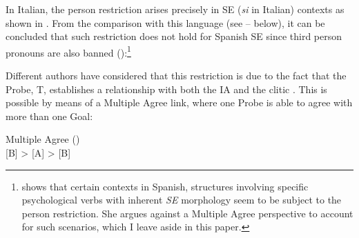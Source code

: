 \documentclass[output=paper,colorlinks,citecolor=brown]{langscibook}
\begin{document}
In Italian, the person restriction arises precisely in
SE (\textit{si} in Italian) contexts as shown in . From the comparison with this language (see -- below), it can be concluded that such restriction does not hold for Spanish SE since third person pronouns are also banned
(\citealt[248]{OrdonezTrevino2016}):\footnote{\citet{Rivero2004} shows that certain contexts in Spanish, structures involving specific psychological verbs with inherent \textit{SE} morphology seem to be subject to the person restriction. She argues against a Multiple Agree perspective to account for such scenarios, which I leave aside in this paper.}

\ea \label{ex:05:SEitpers} \citet[80]{Pescarini2018}
\label{ex:05:SEitpersa}
\label{ex:05:SEitpersb}
\z \z

\ea \label{ex:05:SESPpers}
\label{ex:05:SESPpersa}
\label{ex:05:SESPpersb}
\z \z

Different authors have considered that this restriction is due to the fact that the Probe, T, establishes a relationship with both the IA and the clitic \citep{DAlessandro2007, Lopez2007}. This is possible by means of a Multiple Agree \citep{Hiraiwa2001} link, where one Probe is able to agree with more than one Goal:

\newpage
\ea \label{ex:05:esqMA} Multiple Agree (\citealt[69]{Hiraiwa2001}) \\
\ConnectTail{\ConnectTail{$\upalpha$}[A]}[B]  > \ConnectHead[2ex]{$\upbeta$}[A] > \ConnectHead [3ex]{$\upgamma$}[B]
\z
\vspace{3mm}
\end{document}
